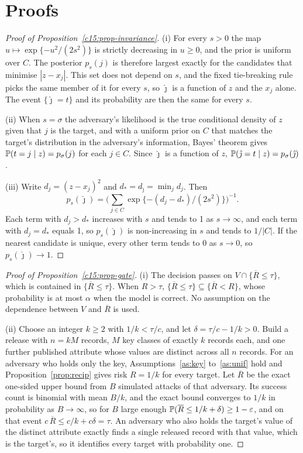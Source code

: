 \section{Proofs}

\begin{proof}[Proof of Proposition~\ref{c15:prop-invariance}]
(i) For every $s > 0$ the map $u \mapsto \exp\{-u^2/(2s^2)\}$ is strictly decreasing
in $u \ge 0$, and the prior is uniform over $C$. The posterior $p_s(j)$ is therefore
largest exactly for the candidates that minimise $|z - x_j|$. This set does not
depend on $s$, and the fixed tie-breaking rule picks the same member of it for
every $s$, so $\hat\jmath$ is a function of $z$ and the $x_j$ alone. The event
$\{\hat\jmath = t\}$ and its probability are then the same for every $s$.

(ii) When $s = \sigma$ the adversary's likelihood is the true conditional density of
$z$ given that $j$ is the target, and with a uniform prior on $C$ that matches the
target's distribution in the adversary's information, Bayes' theorem gives
$\mathbb{P}(t = j \mid z) = p_\sigma(j)$ for each $j \in C$. Since $\hat\jmath$ is a function
of $z$, $\mathbb{P}(\hat\jmath = t \mid z) = p_\sigma(\hat\jmath)$.

(iii) Write $d_j = (z - x_j)^2$ and $d_* = d_{\hat\jmath} = \min_j d_j$. Then
\[
p_s(\hat\jmath) = \Big(\sum_{j \in C} \exp\{-(d_j - d_*)/(2s^2)\}\Big)^{-1}.
\]
Each term with $d_j > d_*$ increases with $s$ and tends to 1 as $s \to \infty$, and
each term with $d_j = d_*$ equals 1, so $p_s(\hat\jmath)$ is non-increasing in $s$
and tends to $1/|C|$. If the nearest candidate is unique, every other term tends to
0 as $s \to 0$, so $p_s(\hat\jmath) \to 1$.
\end{proof}

\begin{proof}[Proof of Proposition~\ref{c15:prop-gate}]
(i) The decision passes on $V \cap \{\overline{R} \le \tau\}$, which is contained in
$\{\overline{R} \le \tau\}$. When $R > \tau$, $\{\overline{R} \le \tau\} \subseteq
\{\overline{R} < R\}$, whose probability is at most $\alpha$ when the model is
correct. No assumption on the dependence between $V$ and $\overline{R}$ is used.

(ii) Choose an integer $k \ge 2$ with $1/k < \tau/c$, and let $\delta = \tau/c - 1/k > 0$.
Build a release with $n = kM$ records, $M$ key classes of exactly $k$ records each,
and one further published attribute whose values are distinct across all $n$
records. For an adversary who holds only the key, Assumptions~\ref{as:key}
to~\ref{as:unif} hold and Proposition~\ref{prop:recip} gives risk $R = 1/k$ for every
target. Let $\overline{R}$ be the exact one-sided upper bound from $B$ simulated
attacks of that adversary. Its success count is binomial with mean $B/k$, and the
exact bound converges to $1/k$ in probability as $B \to \infty$, so for $B$ large
enough $\mathbb{P}(\overline{R} \le 1/k + \delta) \ge 1 - \varepsilon$, and on that event
$c\,\overline{R} \le c/k + c\delta = \tau$. An adversary who also holds the target's
value of the distinct attribute exactly finds a single released record with that
value, which is the target's, so it identifies every target with probability one.
\end{proof}
